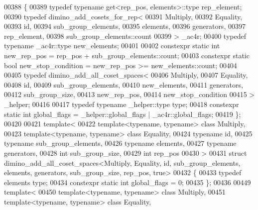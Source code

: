 \begin{DoxyCode}
00388 \{
00389   \textcolor{keyword}{typedef} \textcolor{keyword}{typename} get<rep\_pos, elements>::type rep\_element;
00390   \textcolor{keyword}{typedef} dimino\_add\_cosets\_for\_rep<
00391     Multiply,
00392     Equality,
00393     id,
00394     sub\_group\_elements,
00395     elements,
00396     generators,
00397     rep\_element,
00398     sub\_group\_elements::count
00399   > \_ac4r;
00400   \textcolor{keyword}{typedef} \textcolor{keyword}{typename} \_ac4r::type new\_elements;
00401   
00402   constexpr \textcolor{keyword}{static} \textcolor{keywordtype}{int} new\_rep\_pos = rep\_pos + sub\_group\_elements::count;
00403   constexpr \textcolor{keyword}{static} \textcolor{keywordtype}{bool} new\_stop\_condition = new\_rep\_pos >= new\_elements::count;
00404 
00405   \textcolor{keyword}{typedef} dimino\_add\_all\_coset\_spaces<
00406     Multiply,
00407     Equality,
00408     id,
00409     sub\_group\_elements,
00410     new\_elements,
00411     generators,
00412     sub\_group\_size,
00413     new\_rep\_pos,
00414     new\_stop\_condition
00415   > \_helper;
00416 
00417   \textcolor{keyword}{typedef} \textcolor{keyword}{typename} \_helper::type type;
00418   constexpr \textcolor{keyword}{static} \textcolor{keywordtype}{int} global\_flags = \_helper::global\_flags | \_ac4r::global\_flags;
00419 \};
00420 
00421 \textcolor{keyword}{template}<
00422   \textcolor{keyword}{template}<\textcolor{keyword}{typename}, \textcolor{keyword}{typename}> \textcolor{keyword}{class }Multiply,
00423   \textcolor{keyword}{template}<\textcolor{keyword}{typename}, \textcolor{keyword}{typename}> \textcolor{keyword}{class }Equality,
00424   \textcolor{keyword}{typename} id,
00425   \textcolor{keyword}{typename} sub\_group\_elements,
00426   \textcolor{keyword}{typename} elements,
00427   \textcolor{keyword}{typename} generators,
00428   \textcolor{keywordtype}{int} sub\_group\_size,
00429   \textcolor{keywordtype}{int} rep\_pos
00430 >
00431 \textcolor{keyword}{struct }dimino\_add\_all\_coset\_spaces<Multiply, Equality, id, sub\_group\_elements, elements, generators, 
      sub\_group\_size, rep\_pos, true>
00432 \{
00433   \textcolor{keyword}{typedef} elements type;
00434   constexpr \textcolor{keyword}{static} \textcolor{keywordtype}{int} global\_flags = 0;
00435 \};
00436 
00449 \textcolor{keyword}{template}<
00450   \textcolor{keyword}{template}<\textcolor{keyword}{typename}, \textcolor{keyword}{typename}> \textcolor{keyword}{class }Multiply,
00451   \textcolor{keyword}{template}<\textcolor{keyword}{typename}, \textcolor{keyword}{typename}> \textcolor{keyword}{class }Equality,

\end{DoxyCode}
